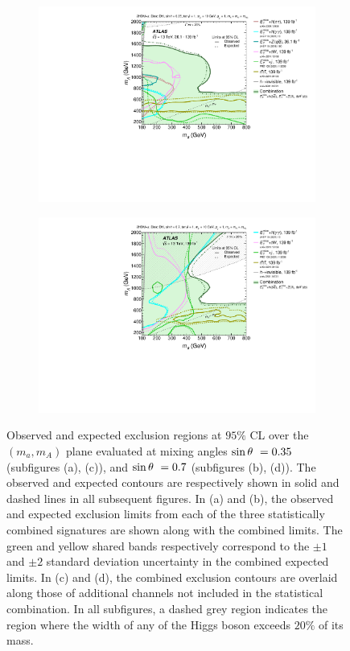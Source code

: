 \begin{figure}[h!]
\begin{subfigure}[2]{0.495\textwidth}
        \includegraphics[width=\linewidth]{figures/fig_04c.pdf}
        \caption{}
        \label{fig:result-ma-mA-scan-c}
    \end{subfigure}
    \begin{subfigure}[2]{0.495\textwidth}
        \centering
        \includegraphics[width=\linewidth]{figures/fig_04d.pdf}
        \caption{}
        \label{fig:result-ma-mA-scan-d}
    \end{subfigure}
    \caption{Observed and expected exclusion regions at $95\%$ CL over the $(m_a, m_A)$ plane evaluated at \thdma mixing angles $\sin\theta~=0.35$ (subfigures (a), (c)), and $\sin\theta~=0.7$ (subfigures (b), (d)). The observed and expected contours are respectively shown in solid and dashed lines in all subsequent figures. In (a) and (b), the observed and expected exclusion limits from each of the three statistically combined signatures are shown along with the combined limits. The green and yellow shared bands respectively correspond to the $\pm1$ and $\pm2$ standard deviation uncertainty in the combined expected limits. In (c) and (d), the combined exclusion contours are overlaid along those of additional channels not included in the statistical combination. In all subfigures, a dashed grey region indicates the region where the width of any of the Higgs boson exceeds $20\%$ of its mass. }
    \label{fig:result-ma-mA-scan}
\end{figure} 

